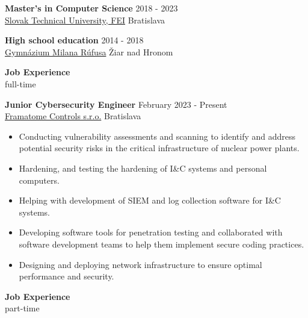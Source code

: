\documentclass[12pt]{article}
\begin{document}
\noindent
{\bfseries Master's in Computer Science } \hfill 2018 - 2023 \\ 
\noindent \href{https://www.fei.stuba.sk/english.html?page_id=793}{Slovak Technical University, FEI} \hfill Bratislava
{\setlength{\parindent}{1.1in} 
\noindent

\vspace{0.1in}

\noindent
{\bfseries High school education } \hfill 2014 - 2018 \\ 
\noindent \href{https://gymziar.edupage.org/}{Gymnázium Milana Rúfusa}  \hfill Žiar nad Hronom 
{\setlength{\parindent}{1.1in} 
\noindent


\vspace{0.2in} %

\begin{center}
	{\noindent \bfseries Job Experience} \\
	{full-time}
\end{center}

\noindent
{\bfseries Junior Cybersecurity Engineer} \hfill February 2023 - Present \\  
\noindent \href{https://www.framatome.com/en/about/}{Framatome Controls s.r.o.} \hfill Bratislava
\begin{itemize} \itemsep -2pt %
\item Conducting vulnerability assessments and scanning to identify and address potential security risks in the critical infrastructure of nuclear power plants.
\item Hardening, and testing the hardening of I\&C systems and personal computers.
\item Helping with development of SIEM and log collection software for I\&C systems.
\item Developing software tools for penetration testing and collaborated with software development teams to help them implement secure coding practices.
\item Designing and deploying network infrastructure to ensure optimal performance and security.
\end{itemize}

\vspace{0.2in} %

\begin{center}
	{\noindent \bfseries Job Experience} \\
	{part-time}
\end{center}

}}
\end{document}
